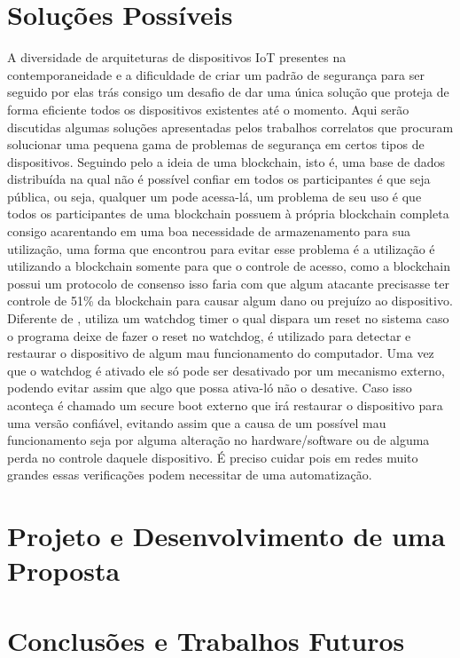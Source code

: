 \documentclass[article,12pt]{abntex2}
\begin{document}
\section{Soluções Possíveis}
A diversidade de arquiteturas de dispositivos IoT presentes na contemporaneidade e a dificuldade de criar um padrão de segurança para ser seguido por elas trás consigo um desafio de dar uma única solução que proteja de forma eficiente todos os dispositivos existentes até o momento. Aqui serão discutidas algumas soluções apresentadas pelos trabalhos correlatos que procuram solucionar uma pequena gama de problemas de segurança em certos tipos de dispositivos.
\newline
Seguindo pelo a ideia de uma blockchain, isto é, uma base de dados distribuída na qual não é possível confiar em todos os participantes é que seja pública, ou seja, qualquer um  pode acessa-lá, um problema de seu uso é que todos os participantes de uma blockchain possuem à própria blockchain completa consigo acarentando em uma boa necessidade de armazenamento para sua utilização, uma forma que \cite{Alphand:2018} encontrou para evitar esse problema é a utilização é utilizando a blockchain somente para que o controle de acesso, como a blockchain possui um protocolo de consenso isso faria com que algum atacante precisasse ter controle de 51\% da blockchain para causar algum dano ou prejuízo ao dispositivo.
\newline
Diferente de \cite{Alphand:2018}, \cite{Auer:2019} utiliza um watchdog timer o qual dispara um reset no sistema caso o programa deixe de fazer o reset no watchdog, é utilizado para detectar e restaurar o dispositivo de algum mau funcionamento do computador. Uma vez que o watchdog é ativado ele só pode ser desativado por um mecanismo externo, podendo evitar assim que algo que possa ativa-ló não o desative. Caso isso aconteça é chamado um secure boot externo que irá restaurar o dispositivo para uma versão confiável, evitando assim que a causa de um possível mau funcionamento seja por alguma alteração no hardware/software ou de alguma perda no controle daquele dispositivo. É preciso cuidar pois em redes muito grandes essas verificações podem necessitar de uma automatização.
\section{Projeto e Desenvolvimento de uma Proposta}
\section{Conclusões e Trabalhos Futuros}
\end{document}
